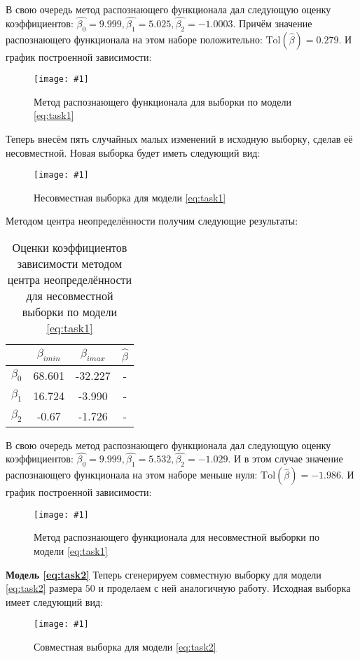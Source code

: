 \documentclass[a4paper,12pt]{article}
\newcommand{\plot}[3]{
    \begin{figure}[H]
        \texttt{[image: \#1]}
        \caption{#2}
        \label{#3}
    \end{figure}
}
\begin{document}
    \noindent В свою очередь метод распознающего функционала дал следующую оценку коэффициентов:
    $ \hat{\beta_{0}} = 9.999, \hat{\beta_{1}} = 5.025, \hat{\beta_{2}} = -1.0003 $.
    Причём значение распознающего функционала на этом наборе положительно: $ \text{Tol}(\hat{\beta}) = 0.279 $.
    \newline
    И график построенной зависимости:
    \plot{TolValidData25}{Метод распознающего функционала для выборки по модели \ref{eq:task1}}{p:tolvaliddata25}

    \noindent Теперь внесём пять случайных малых изменений в исходную выборку, сделав её несовместной.
    Новая выборка будет иметь следующий вид:
    \plot{DataWithEstims25}{Несовместная выборка для модели \ref{eq:task1}}{p:estimdata25} 
    
    \noindent Методом центра неопределённости получим следующие результаты:
    \begin{table}[H]
        \begin{center}
            \begin{tabular}{| c | c | c | c |}
                \hline
                & $ \beta_{imin} $ & $ \beta_{imax} $ & $ \hat{\beta} $ \\
                \hline
                $ \beta_{0} $ & 68.601 & -32.227 & - \\
                \hline
                $ \beta_{1} $ & 16.724 & -3.990 & - \\
                \hline
                $ \beta_{2} $ & -0.67 & -1.726 & - \\
                \hline
            \end{tabular}
        \end{center}
        \caption{Оценки коэффициентов зависимости методом центра неопределённости для несовместной выборки по модели \ref{eq:task1}}
        \label{t:estimdata25}
    \end{table}
    \noindent

    \noindent В свою очередь метод распознающего функционала дал следующую оценку коэффициентов:
    $ \hat{\beta_{0}} = 9.999, \hat{\beta_{1}} = 5.532, \hat{\beta_{2}} = -1.029 $.
    И в этом случае значение распознающего функционала на этом наборе меньше нуля: $ \text{Tol}(\hat{\beta}) = -1.986 $.
    \newline
    И график построенной зависимости:
    \plot{TolDataWithEstims25}{Метод распознающего функционала для несовместной выборки по модели \ref{eq:task1}}{p:tolestimdata25}

    \noindent\textbf{Модель \ref{eq:task2}} \newline
    Теперь сгенерируем совместную выборку для модели \ref{eq:task2} размера $ 50 $ и проделаем с ней аналогичную работу.
    Исходная выборка имеет следующий вид:
    \plot{ValidData50}{Совместная выборка для модели \ref{eq:task2}}{p:validdata50}
\end{document}
